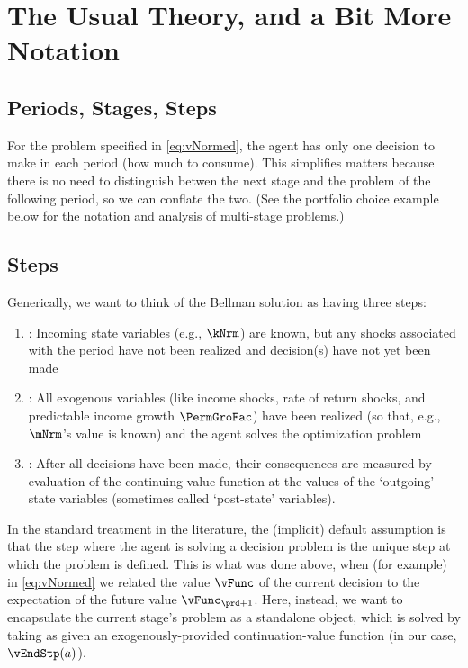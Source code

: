 \documentclass[\econtexRoot/SolvingMicroDSOPs]{subfiles}
\begin{document}
\hypertarget{the-usual-theory}{}
\section{The Usual Theory, and a Bit More Notation}\label{sec:the-usual-theory}


\subsection{Periods, Stages, Steps}

For the problem specified in \eqref{eq:vNormed}, the agent has only one decision to make in each {period} (how much to consume). %
This simplifies matters because there is no need to distinguish betwen the next {stage} and the problem of the following {period}, so we can conflate the two.  (See the portfolio choice example below for the notation and analysis of multi-{stage} problems.)

\subsection{Steps}

Generically, we want to think of the Bellman solution as having three {steps}:
\begin{enumerate}
\item \textbf{\Arrival}: Incoming state variables (e.g., $\kNrm$) are known, but any shocks associated with the period have not been realized and decision(s) have not yet been made
\item \textbf{\Decision}: All exogenous variables (like income shocks, rate of return shocks, and predictable income growth $\PermGroFac$) have been realized (so that, e.g., $\mNrm$'s value is known) and the agent solves the optimization problem
\item \textbf{\Continuation}: After all decisions have been made, their consequences are measured by evaluation of the continuing-value function at the values of the `outgoing' state variables (sometimes called `post-state' variables).
\end{enumerate}

In the standard treatment in the literature, the (implicit) default assumption is that the {step} where the agent is solving a decision problem is the unique {step} at which the problem is defined.  This is what was done above, when (for example) in \eqref{eq:vNormed} we related the value $\vFunc$ of the current decision to the expectation of the future value $\vFunc_{\prd+1}$.  Here, instead, we want to encapsulate the current {stage}'s problem as a standalone object, which is solved by taking as given an exogenously-provided continuation-value function (in our case, $\vEndStp(a)$).
\end{document}
